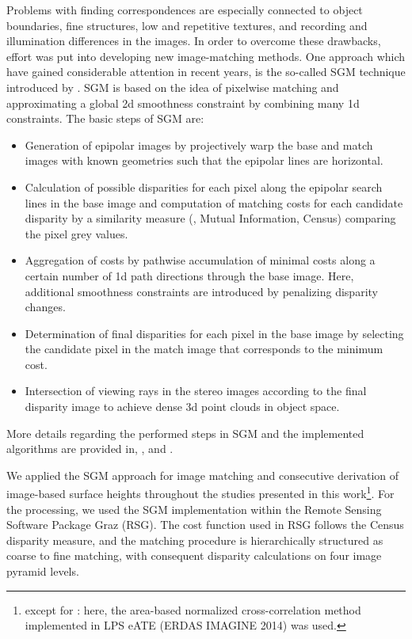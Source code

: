 Problems with finding correspondences are especially connected to object boundaries, fine structures, low and repetitive textures, and recording
and illumination differences in the images.
In order to overcome these drawbacks, effort was put into developing new image-matching methods.
One approach which have gained considerable attention in recent years, is the so-called \acf{SGM} technique introduced by \textcite{Hirschmuller.2005,Hirschmuller.2008}.
\ac{SGM} is based on the idea of pixelwise matching and approximating a global 2d smoothness constraint by combining 
many 1d constraints.
The basic steps of \ac{SGM} are:
\begin{itemize}
	\item Generation of epipolar images by projectively warp the base and match images with known geometries 
		such that the epipolar lines are horizontal.
	\item Calculation of possible disparities for each pixel along the epipolar search lines in the base image and computation of 
		matching costs for each candidate disparity by a similarity measure (\eg, Mutual Information, Census) comparing the pixel grey values. 
	\item Aggregation of costs by pathwise accumulation of minimal costs along a certain number of 1d path directions through the base image.
		Here, additional smoothness constraints are introduced by penalizing disparity changes.
	\item Determination of final disparities for each pixel in the base image by selecting the candidate pixel in the match image 
		that corresponds to the minimum cost.
	\item Intersection of viewing rays in the stereo images according to the final disparity image to achieve 
	dense 3d point clouds in object space. 
\end{itemize}
More details regarding the performed steps in \ac{SGM} and the implemented algorithms are provided in, \eg, \textcite{Hirschmuller.2008,Hirschmuller.2011} and \textcite{Gehrke.2010}.

We applied the \ac{SGM} approach for image matching and consecutive derivation of image-based surface heights throughout the studies
presented in this work\footnote{except for \textcite{Immitzer.2016}: here, the area-based normalized cross-correlation method implemented 
	in LPS eATE (ERDAS IMAGINE 2014) was used.}. 
For the processing, we used the \ac{SGM} implementation within the Remote Sensing Software Package Graz (RSG).
The cost function used in RSG follows the Census disparity measure, and 
the matching procedure is hierarchically structured as coarse to fine matching, with consequent disparity calculations on four image pyramid levels. 

